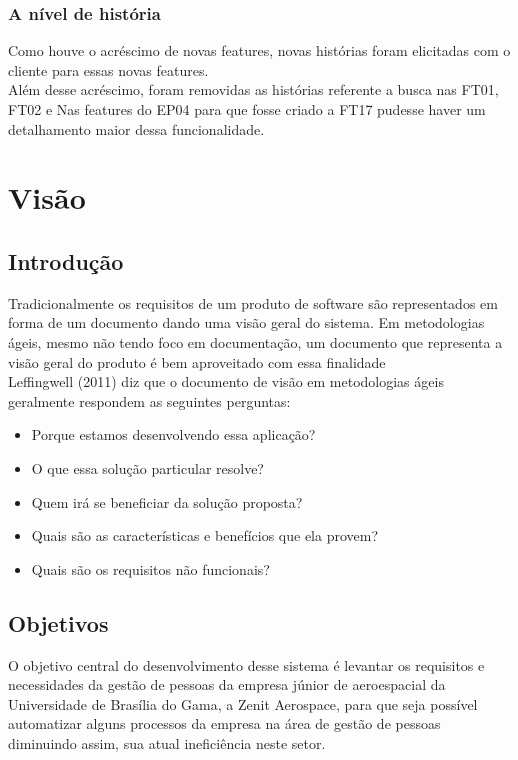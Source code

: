 \begin{anexosenv}
\subsection[A nível de história]{A nível de história}

Como houve o acréscimo de novas features, novas histórias foram elicitadas com o cliente para essas novas features.\\
Além desse acréscimo, foram removidas as histórias referente a busca nas FT01, FT02  e Nas features do EP04 para que fosse criado a FT17 pudesse haver um detalhamento maior dessa funcionalidade.\\

\chapter[Visão]{Visão}\label{docVisao}

\section[Introdução]{Introdução}

Tradicionalmente os requisitos de um produto de software são representados em forma de um documento dando uma visão geral do sistema. Em metodologias ágeis, mesmo não tendo foco em documentação, um documento que representa a visão geral do produto é bem aproveitado com essa finalidade \cite{leffingwell2011}\\

Leffingwell (2011) diz que o documento de visão em metodologias ágeis geralmente respondem as seguintes perguntas:
\begin{itemize}
    \item Porque estamos desenvolvendo essa aplicação?
    \item O que essa solução particular resolve?
    \item Quem irá se beneficiar da solução proposta?
    \item Quais são as características e benefícios que ela provem?
    \item Quais são os requisitos não funcionais?
\end{itemize}

\section[Objetivos]{Objetivos}

O objetivo central do desenvolvimento desse sistema é levantar os requisitos e necessidades da gestão de pessoas da empresa júnior de aeroespacial da Universidade de Brasília do Gama, a Zenit Aerospace, para que seja possível automatizar alguns processos da empresa na área de gestão de pessoas diminuindo assim, sua atual ineficiência neste setor.\\


\end{anexosenv}
